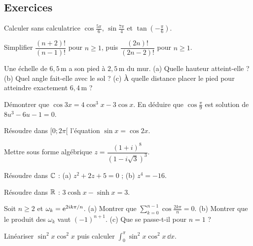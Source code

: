 \subsection{Exercices}
\begin{exo}[A]\label{c1e1}
Calculer sans calculatrice $\cos\frac{5\pi}6$, $\sin\frac{7\pi}4$ et $\tan(-\frac\pi6)$.
\end{exo}
\begin{exo}[A]\label{c1e2}
Simplifier $\dfrac{(n+2)!}{(n-1)!}$ pour $n\ge1$, puis $\dfrac{(2n)!}{(2n-2)!}$ pour $n\ge1$.
\end{exo}
\begin{exo}[A]\label{c1e3}
Une échelle de $6{,}5\,\mathrm m$ a son pied à $2{,}5\,\mathrm m$ du mur. (a) Quelle hauteur atteint-elle ? (b) Quel angle fait-elle avec le sol ? (c) À quelle distance placer le pied pour atteindre exactement $6{,}4\,\mathrm m$ ?
\end{exo}
\begin{exo}[B]\label{c1e4}
Démontrer que $\cos3x=4\cos^3x-3\cos x$. En déduire que $\cos\frac\pi9$ est solution de $8u^3-6u-1=0$.
\end{exo}
\begin{exo}[B]\label{c1e5}
Résoudre dans $[0;2\pi[$ l'équation $\sin x=\cos2x$.
\end{exo}
\begin{exo}[B]\label{c1e6}
Mettre sous forme algébrique $z=\dfrac{(1+i)^8}{(1-i\sqrt3)^3}$.
\end{exo}
\begin{exo}[B]\label{c1e7}
Résoudre dans $\mathbb{C}$ : (a) $z^2+2z+5=0$ ; (b) $z^4=-16$.
\end{exo}
\begin{exo}[C]\label{c1e8}
Résoudre dans $\mathbb{R}$ : $3\cosh x-\sinh x=3$.
\end{exo}
\begin{exo}[C]\label{c1e9}
Soit $n\ge2$ et $\omega_k=\mathrm{e}^{2ik\pi/n}$. (a) Montrer que $\sum_{k=0}^{n-1}\cos\frac{2k\pi}n=0$. (b) Montrer que le produit des $\omega_k$ vaut $(-1)^{n+1}$. (c) Que se passe-t-il pour $n=1$ ?
\end{exo}
\begin{exo}[C]\label{c1e10}
Linéariser $\sin^2x\cos^2x$ puis calculer $\int_0^\pi\sin^2x\cos^2x\,\dd x$.
\end{exo}

\ifcorr
